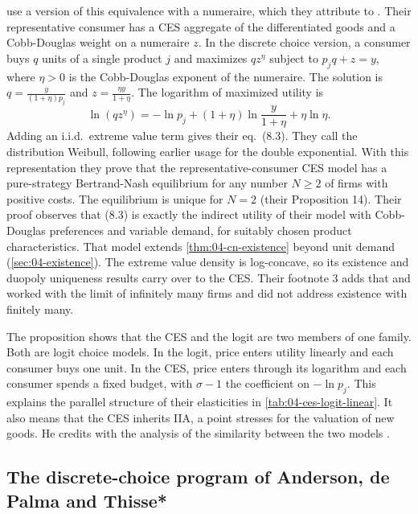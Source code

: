  use a version of this equivalence with a numeraire, which they attribute to
\citet{AndersonDePalmaThisse1988b}. Their representative consumer has a CES aggregate of the differentiated goods and a
Cobb-Douglas weight on a numeraire $z$. In the discrete choice
version, a consumer buys $q$ units of a single product $j$ and maximizes $qz^\eta$ subject to $p_jq + z = y$, where
$\eta > 0$ is the Cobb-Douglas exponent of the numeraire. The solution is $q = \frac{y}{(1+\eta)p_j}$ and
$z = \frac{\eta y}{1 + \eta}$. The logarithm of maximized utility is
\begin{equation*}
\ln(qz^\eta) = -\ln p_j + (1 + \eta)\ln\frac{y}{1 + \eta} + \eta\ln\eta .
\end{equation*}
Adding an i.i.d.\ extreme value term gives their eq.~(8.3). They call the distribution Weibull, following earlier
usage for the double exponential. With this representation they prove that the representative-consumer CES model
has a pure-strategy Bertrand-Nash equilibrium for any number $N \ge 2$ of firms with positive costs. The
equilibrium is unique for $N = 2$ (their Proposition 14). Their proof observes that (8.3) is exactly the indirect
utility of their model with Cobb-Douglas preferences and variable demand, for suitably chosen product
characteristics. That model extends \cref{thm:04-cn-existence} beyond unit demand (\cref{sec:04-existence}). The
extreme value density is log-concave, so its existence and duopoly uniqueness results carry over to the CES.
Their footnote 3 adds that \citet{DixitStiglitz1977} and \citet{Spence1976} worked with the limit of infinitely many
firms and did not address existence with finitely many.

The proposition shows that the CES and the logit are two members of one family. Both are logit choice models. In
the logit, price enters utility linearly and each consumer buys one unit. In the CES, price enters through its
logarithm and each consumer spends a fixed budget, with $\sigma - 1$ the coefficient on $-\ln p_j$. This explains the
parallel structure of their elasticities in \cref{tab:04-ces-logit-linear}. It also means that the CES inherits IIA,
a point \citet[p.~230]{Hausman1997} stresses for the valuation of new goods. He credits
\citet{AndersonDePalmaThisse1992} with the analysis of the similarity between the two models
\citep[n.~29]{Hausman1997}.

\subsection{The discrete-choice program of Anderson, de Palma and Thisse*}\label{sec:04-repcons-adt}

